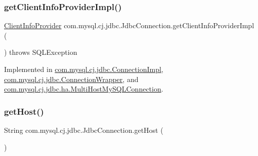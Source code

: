 \mbox{\label{interfacecom_1_1mysql_1_1cj_1_1jdbc_1_1_jdbc_connection_ab3325dceec74bde20215836ade6845ad}} 
\subsubsection{\texorpdfstring{get\+Client\+Info\+Provider\+Impl()}{getClientInfoProviderImpl()}}
{\footnotesize\ttfamily \mbox{\hyperlink{interfacecom_1_1mysql_1_1cj_1_1jdbc_1_1_client_info_provider}{Client\+Info\+Provider}} com.\+mysql.\+cj.\+jdbc.\+Jdbc\+Connection.\+get\+Client\+Info\+Provider\+Impl (\begin{DoxyParamCaption}{ }\end{DoxyParamCaption}) throws S\+Q\+L\+Exception}



Implemented in \mbox{\hyperlink{classcom_1_1mysql_1_1cj_1_1jdbc_1_1_connection_impl_a42c6229cfa86fad57f1ca738f94e048e}{com.\+mysql.\+cj.\+jdbc.\+Connection\+Impl}}, \mbox{\hyperlink{classcom_1_1mysql_1_1cj_1_1jdbc_1_1_connection_wrapper_ade0b119a9d79e5bf3433ad6e843b9f0a}{com.\+mysql.\+cj.\+jdbc.\+Connection\+Wrapper}}, and \mbox{\hyperlink{classcom_1_1mysql_1_1cj_1_1jdbc_1_1ha_1_1_multi_host_my_s_q_l_connection_aa8c297293e99a34e78de7dd1cbaa6450}{com.\+mysql.\+cj.\+jdbc.\+ha.\+Multi\+Host\+My\+S\+Q\+L\+Connection}}.

\mbox{\label{interfacecom_1_1mysql_1_1cj_1_1jdbc_1_1_jdbc_connection_a2cadbe78f509f56fb4461f81ae10934e}} 
\subsubsection{\texorpdfstring{get\+Host()}{getHost()}}
{\footnotesize\ttfamily String com.\+mysql.\+cj.\+jdbc.\+Jdbc\+Connection.\+get\+Host (\begin{DoxyParamCaption}{ }\end{DoxyParamCaption})}



